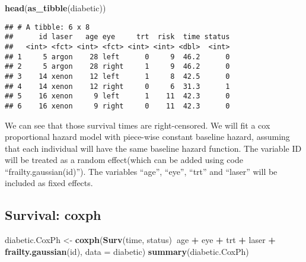 \documentclass[]{article}
\newenvironment{Shaded}{\begin{snugshade}}{\end{snugshade}}
\newcommand{\DataTypeTok}[1]{\textcolor[rgb]{0.13,0.29,0.53}{#1}}
\newcommand{\KeywordTok}[1]{\textcolor[rgb]{0.13,0.29,0.53}{\textbf{#1}}}
\newcommand{\NormalTok}[1]{#1}
\newcommand{\OperatorTok}[1]{\textcolor[rgb]{0.81,0.36,0.00}{\textbf{#1}}}
\newcommand{\StringTok}[1]{\textcolor[rgb]{0.31,0.60,0.02}{#1}}
\begin{document}
\begin{Shaded}
\begin{Highlighting}[]
\KeywordTok{head}\NormalTok{(}\KeywordTok{as_tibble}\NormalTok{(diabetic))}
\end{Highlighting}
\end{Shaded}

\begin{verbatim}
## # A tibble: 6 x 8
##      id laser   age eye     trt  risk  time status
##   <int> <fct> <int> <fct> <int> <int> <dbl>  <int>
## 1     5 argon    28 left      0     9  46.2      0
## 2     5 argon    28 right     1     9  46.2      0
## 3    14 xenon    12 left      1     8  42.5      0
## 4    14 xenon    12 right     0     6  31.3      1
## 5    16 xenon     9 left      1    11  42.3      0
## 6    16 xenon     9 right     0    11  42.3      0
\end{verbatim}

We can see that those survival times are right-censored. We will fit a
cox proportional hazard model with piece-wise constant baseline hazard,
assuming that each individual will have the same baseline hazard
function. The variable ID will be treated as a random effect(which can
be added using code ``frailty.gaussian(id)''). The variables ``age'',
``eye'', ``trt'' and ``laser'' will be included as fixed effects.

\hypertarget{survival-coxph}{%
\subsection{Survival: coxph}\label{survival-coxph}}

\begin{Shaded}
\begin{Highlighting}[]
\NormalTok{diabetic.CoxPh <-}\StringTok{ }\KeywordTok{coxph}\NormalTok{(}\KeywordTok{Surv}\NormalTok{(time, status)}\OperatorTok{~}\NormalTok{age }\OperatorTok{+}\StringTok{ }\NormalTok{eye }\OperatorTok{+}\StringTok{ }\NormalTok{trt }\OperatorTok{+}\StringTok{ }\NormalTok{laser }\OperatorTok{+}\StringTok{ }\KeywordTok{frailty.gaussian}\NormalTok{(id), }\DataTypeTok{data =}\NormalTok{ diabetic)}
\KeywordTok{summary}\NormalTok{(diabetic.CoxPh)}
\end{Highlighting}
\end{Shaded}
\end{document}
